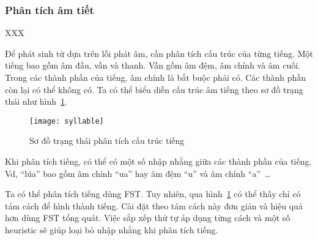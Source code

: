 \documentclass[a4paper,oneside,14pt]{extbook} %
\begin{document}


\subsubsection{Phân tích âm tiết}
\label{sec:realword:syllable}

XXX%

Để phát sinh từ dựa trên lỗi phát âm, cần phân tích cấu trúc của từng
tiếng. Một tiếng bao gồm âm đầu, vần và thanh. Vần gồm âm đệm, âm
chính và âm cuối. Trong các thành phần của tiếng, âm chính là bắt buộc
phải có. Các thành phần còn lại có thể không có. Ta có thể biểu diễn
cấu trúc âm tiếng theo sơ đồ trạng thái như hình~\ref{fig:syllable}.

\begin{figure}[htbp]
  \centering
  \texttt{[image: syllable]}
  \caption{Sơ đồ trạng thái phân tích cấu trúc tiếng}
  \label{fig:syllable}
\end{figure}

Khi phân tích tiếng, có thể có một số nhập nhằng giữa các thành phần
của tiếng. Vd, ``lúa'' bao gồm âm chính ``ua'' hay âm đệm ``u'' và âm
chính ``a''~\ldots{}

Ta có thể phân tích tiếng dùng FST. Tuy nhiên, qua
 hình~\ref{fig:syllable}
 có thể thấy chỉ có tám cách để hình thành
tiếng. Cài đặt theo tám cách này đơn giản và hiệu quả hơn dùng FST
tổng quát. Việc sắp xếp thứ tự áp dụng từng cách và một số heuristic
sẽ giúp loại bỏ nhập nhằng khi phân tích tiếng. 
\end{document}
